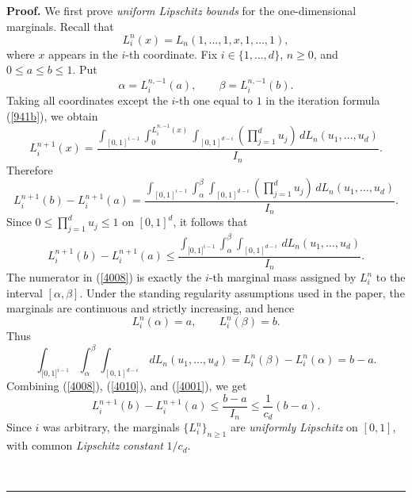 \documentclass[onecolumn]{article}
\newenvironment{proof}[1][Proof]{\noindent\textbf{#1.} }{\ \rule{0.5em}{0.5em}}
\begin{document}
\begin{proof}
We first prove \textit{uniform Lipschitz bounds} for the one-dimensional
marginals. Recall that 
\begin{equation}
L_{i}^{n}(x)=L_{n}(1,\ldots ,1,x,1,\ldots ,1),  \label{4004}
\end{equation}%
where $x$ appears in the $i$-th coordinate. Fix $i\in \{1,\ldots ,d\}$, $%
n\geq 0$, and $0\leq a\leq b\leq 1$. Put 
\begin{equation}
\alpha =L_{i}^{n,-1}(a),\qquad \beta =L_{i}^{n,-1}(b).  \label{4005}
\end{equation}%
Taking all coordinates except the $i$-th one equal to $1$ in the iteration
formula (\ref{941b}), we obtain 
\begin{equation}
L_{i}^{n+1}(x)=\frac{\int_{[0,1]^{i-1}}\int_{0}^{L_{i}^{n,-1}(x)}%
\int_{[0,1]^{d-i}}\left( \prod_{j=1}^{d}u_{j}\right) \,dL_{n}(u_{1},\ldots
,u_{d})}{I_{n}}.  \label{4006}
\end{equation}%
Therefore 
\begin{equation}
L_{i}^{n+1}(b)-L_{i}^{n+1}(a)=\frac{\int_{[0,1]^{i-1}}\int_{\alpha }^{\beta
}\int_{[0,1]^{d-i}}\left( \prod_{j=1}^{d}u_{j}\right) \,dL_{n}(u_{1},\ldots
,u_{d})}{I_{n}}.  \label{4007}
\end{equation}%
Since $0\leq \prod_{j=1}^{d}u_{j}\leq 1$ on $[0,1]^{d}$, it follows that 
\begin{equation}
L_{i}^{n+1}(b)-L_{i}^{n+1}(a)\leq \frac{\int_{\lbrack
0,1]^{i-1}}\int_{\alpha }^{\beta }\int_{[0,1]^{d-i}}\,dL_{n}(u_{1},\ldots
,u_{d})}{I_{n}}.  \label{4008}
\end{equation}%
The numerator in (\ref{4008}) is exactly the $i$-th marginal mass assigned
by $L_{i}^{n}$ to the interval $[\alpha ,\beta ]$. Under the standing
regularity assumptions used in the paper, the marginals are continuous and
strictly increasing, and hence 
\begin{equation}
L_{i}^{n}(\alpha )=a,\qquad L_{i}^{n}(\beta )=b.  \label{4009}
\end{equation}%
Thus 
\begin{equation}
\int_{\lbrack 0,1]^{i-1}}\int_{\alpha }^{\beta
}\int_{[0,1]^{d-i}}\,dL_{n}(u_{1},\ldots ,u_{d})=L_{i}^{n}(\beta
)-L_{i}^{n}(\alpha )=b-a.  \label{4010}
\end{equation}%
Combining (\ref{4008}), (\ref{4010}), and (\ref{4001}), we get 
\begin{equation}
L_{i}^{n+1}(b)-L_{i}^{n+1}(a)\leq \frac{b-a}{I_{n}}\leq \frac{1}{c_{d}}(b-a).
\label{4011}
\end{equation}%
Since $i$ was arbitrary, the marginals $\{L_{i}^{n}\}_{n\geq 1}$ are \textit{%
uniformly Lipschitz} on $[0,1]$, with common \textit{Lipschitz constant} $%
1/c_{d}$.


\end{proof}
\end{document}
